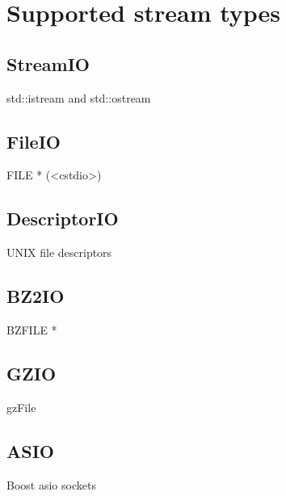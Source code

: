 \chapter{Supported stream types}

\section{\ttfamily StreamIO}
{\ttfamily std::istream} and {\ttfamily std::ostream}

\section{\ttfamily FileIO}
{\ttfamily FILE *} ({\ttfamily <cstdio>})

\section{\ttfamily DescriptorIO}
{UNIX file descriptors}

\section{\ttfamily BZ2IO}
{\ttfamily BZFILE *}

\section{\ttfamily GZIO}
{\ttfamily gzFile}

\section{\ttfamily ASIO}
Boost asio sockets

